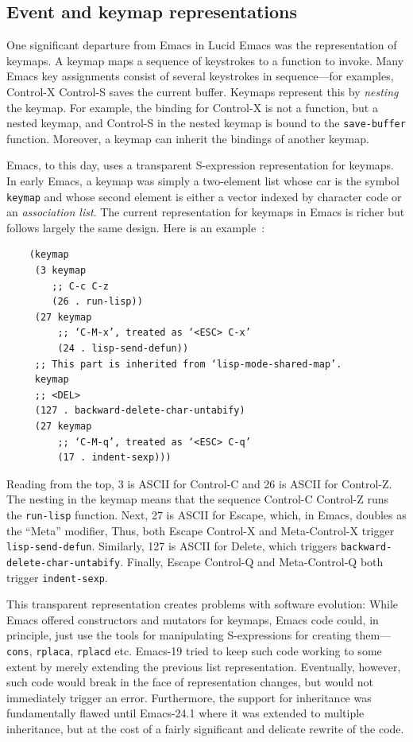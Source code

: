 \documentclass[format=acmsmall, review]{acmart}
\begin{document}
\subsection{Event and keymap representations}
\label{sec:keymaps}

One significant departure from Emacs in Lucid Emacs was the
representation of keymaps.  A keymap maps a sequence of keystrokes to
a function to invoke.  Many Emacs key assignments consist of several
keystrokes in sequence---for examples, Control-X Control-S saves the
current buffer.  Keymaps represent this by \emph{nesting} the keymap.
For example, the binding for Control-X is not a function, but a nested
keymap, and Control-S in the nested keymap is bound to the
\texttt{save-buffer} function.  Moreover, a keymap can inherit the
bindings of another keymap.

Emacs, to this day, uses a transparent
S-expression representation for keymaps.
In early Emacs, a keymap was
simply a two-element list whose car is the symbol \texttt{keymap} and
whose second element is either a vector indexed by character code or an
\emph{association list}.
The current representation for keymaps in Emacs is richer but follows
largely the same design.  Here is an example~\cite{ELispManual2018}:
\begin{verbatim}
    (keymap
     (3 keymap
        ;; C-c C-z
        (26 . run-lisp))
     (27 keymap
         ;; ‘C-M-x’, treated as ‘<ESC> C-x’
         (24 . lisp-send-defun))
     ;; This part is inherited from ‘lisp-mode-shared-map’.
     keymap
     ;; <DEL>
     (127 . backward-delete-char-untabify)
     (27 keymap
         ;; ‘C-M-q’, treated as ‘<ESC> C-q’
         (17 . indent-sexp)))
\end{verbatim}
Reading from the top, 3 is ASCII for Control-C and 26 is ASCII for
Control-Z.  The nesting in the keymap means that the sequence
Control-C Control-Z runs the \texttt{run-lisp} function.  Next, 27 is
ASCII for Escape, which, in Emacs, doubles as the ``Meta'' modifier,
Thus, both Escape Control-X and Meta-Control-X trigger
\texttt{lisp-send-defun}.  Similarly, 127 is ASCII for Delete, which
triggers \texttt{backward-delete-char-untabify}.  Finally, Escape
Control-Q and Meta-Control-Q both trigger \texttt{indent-sexp}.

This transparent representation creates problems with software evolution:
While Emacs offered
constructors and mutators for keymaps, Emacs code could, in principle,
just use the tools for manipulating S-expressions for creating
them---\texttt{cons}, \texttt{rplaca}, \texttt{rplacd} etc.
Emacs-19 tried to keep such code working to some extent by merely
extending the previous list representation.
Eventually, however, such code would break in the face of representation
changes, but would not immediately trigger an error.  Furthermore, the
support for inheritance was fundamentally flawed until Emacs-24.1 where it
was extended to multiple inheritance, but at the cost of a fairly significant
and delicate rewrite of the code.
\end{document}
